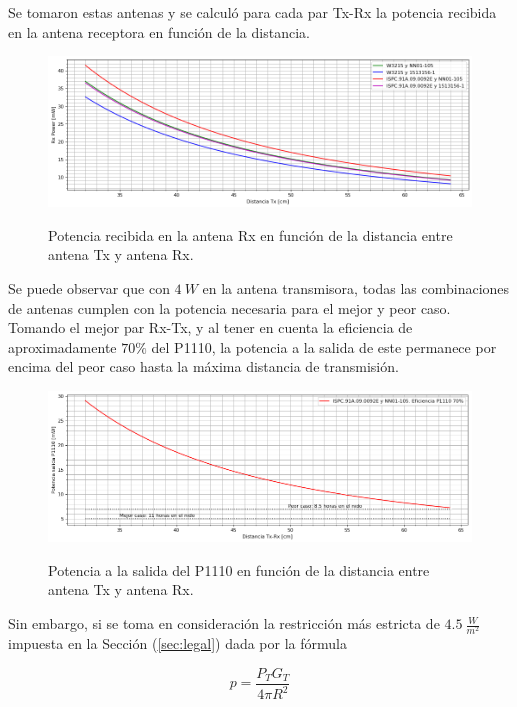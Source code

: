 Se tomaron estas antenas y se calculó para cada par Tx-Rx la potencia recibida en la antena receptora en función de la distancia.

\begin{figure}[H]
	\centering
	\includegraphics[width=\linewidth]{ImagenesFactibilidad/pot_recibida_teorica}
	\label{fig:pot_recibida_teorica}
	\caption{Potencia recibida en la antena Rx en función de la distancia entre antena Tx y antena Rx.}
\end{figure}

Se puede observar que con $4 \ W$ en la antena transmisora, todas las combinaciones de antenas cumplen con la potencia necesaria para el mejor y peor caso. Tomando el mejor par Rx-Tx, y al tener en cuenta la eficiencia de aproximadamente $70\%$ del P1110, la potencia a la salida de este permanece por encima del peor caso hasta la máxima distancia de transmisión.

\begin{figure}[H]
	\centering
	\includegraphics[width=\linewidth]{ImagenesFactibilidad/pot_baterias_teorica}
	\label{fig:pot_baterias_teorica}
	\caption{Potencia a la salida del P1110 en función de la distancia entre antena Tx y antena Rx.}
\end{figure}

Sin embargo, si se toma en consideración la restricción más estricta de $4.5 \  \frac{W}{m^2}$ impuesta en la Sección (\ref{sec:legal}) dada por la fórmula

\begin{equation}
	p = \frac{P_TG_T}{4\pi R^2}
\end{equation}

